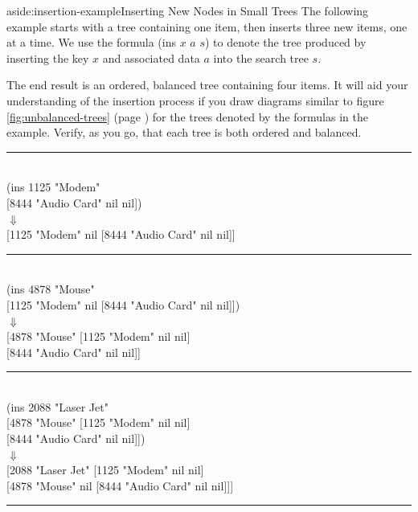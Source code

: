 \begin{aside}{aside:insertion-example}{Inserting New Nodes in Small Trees}
The following example starts with a tree containing one item,
then inserts three new items, one at a time.
We use the formula \textsf{(ins $x$ $a$ $s$)} to denote
the tree produced by inserting the key $x$ and associated
data $a$ into the search tree $s$.

The end result is an ordered,
balanced tree containing four items.
It will aid your understanding
of the insertion process if you draw diagrams similar to figure
\ref{fig:unbalanced-trees} (page \pageref{fig:unbalanced-trees})
for the trees denoted by the formulas in the example.
Verify, as you go, that each tree is both ordered and balanced.
\begin{center}
\begin{tabbing}
%
\vspace*{-1.5\topsep}
\rule{\textwidth}{0.5pt}
\vspace*{-\topsep}
%
\\
\textsf{(ins} \= \textsf{1125 "Modem" }\\
     \> \textsf{{[}8444 "Audio Card" nil nil{]})} \\
     \> $\Downarrow$ \\
\textsf{{[}1125 "Modem" nil {[}8444 "Audio Card" nil nil{]}{]}} \\
%
\vspace*{-1.5\topsep}
\rule{\textwidth}{0.5pt}%
\vspace*{-\topsep}
%
\\
\textsf{(ins} \= \textsf{4878 "Mouse"} \\
     \> \textsf{{[}1125 "Modem" nil {[}8444 "Audio Card" nil nil{]}{]})} \\
     \> $\Downarrow$ \\
\textsf{{[}4878 "Mouse"} \= \textsf{{[}1125 "Modem"      nil nil{]}}  \\
              \> \textsf{{[}8444 "Audio Card" nil nil{]}{]}} \\
%
\vspace*{-1.5\topsep}
\rule{\textwidth}{0.5pt}%
\vspace*{-\topsep}
%
\\
\textsf{(ins} \= \textsf{2088 "Laser Jet"} \\
     \> \textsf{{[}4878 "Mouse"} \= \textsf{{[}1125 "Modem" nil nil{]}} \\
     \>               \> \textsf{{[}8444 "Audio Card" nil nil{]}{]})} \\
     \> $\Downarrow$ \\
\textsf{{[}2088 "Laser Jet"} \= \textsf{{[}1125 "Modem" nil nil{]}} \\
                  \> \textsf{{[}4878 "Mouse" nil {[}8444 "Audio Card" nil nil{]}{]}{]}} \\
%
\vspace*{-1.5\topsep}
\rule{\textwidth}{0.5pt}%
\vspace*{-\topsep}
%
\end{tabbing}
\end{center}
\end{aside}


